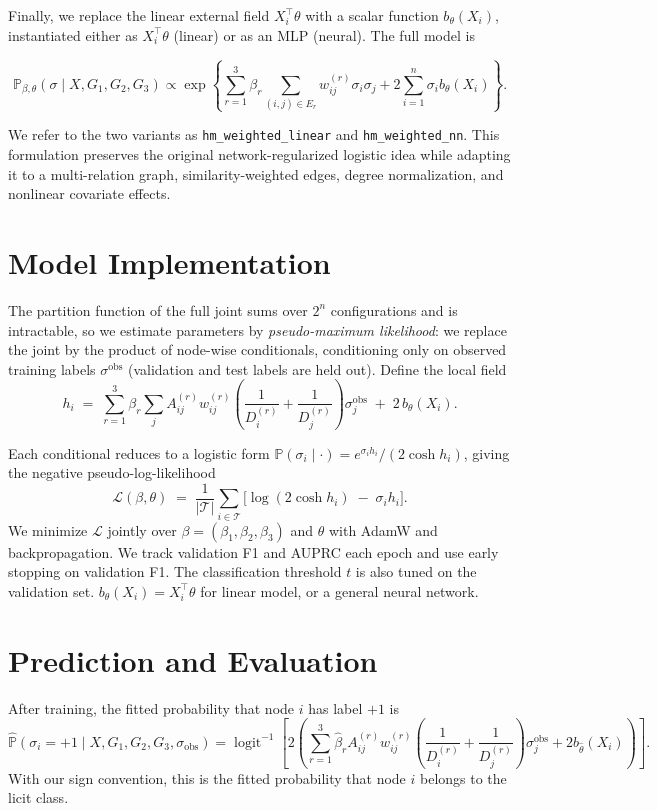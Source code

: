 \documentclass[11pt,reqno]{amsart}
\begin{document}
Finally, we replace the linear external field $X_i^\top\theta$ with a scalar function $b_\theta(X_i)$, instantiated either as $X_i^\top\theta$ (linear) or as an MLP (neural). The full model is


$$
    \mathbb P_{\beta,\theta}(\sigma\mid X,G_1,G_2,G_3)\propto\exp\left\{\sum_{r=1}^3\beta_r\sum_{(i,j)\in E_r}w_{ij}^{(r)}\sigma_i\sigma_j+2\sum_{i=1}^n\sigma_i b_\theta(X_i)\right\}.
$$

We refer to the two variants as \texttt{hm\_weighted\_linear} and \texttt{hm\_weighted\_nn}. This formulation preserves the original network-regularized logistic idea while adapting it to a multi-relation graph, similarity-weighted edges, degree normalization, and nonlinear covariate effects.

\section{Model Implementation}

The partition function of the full joint sums over $2^n$ configurations and is intractable, so we estimate parameters by \emph{pseudo-maximum likelihood}: we replace the joint by the product of node-wise conditionals, conditioning only on observed training labels $\sigma^{\text{obs}}$ (validation and test labels are held out). Define the local field
\[
h_i \;=\; \sum_{r=1}^{3} \beta_r \sum_{j} A_{ij}^{(r)} w_{ij}^{(r)}
\!\left(\frac{1}{D_i^{(r)}} + \frac{1}{D_j^{(r)}}\right)\!
\sigma_j^{\text{obs}}
\;+\; 2\, b_\theta(X_i).
\]

Each conditional reduces to a logistic form $\mathbb{P}(\sigma_i \mid \cdot) = e^{\sigma_i h_i}/(2\cosh h_i)$, giving the negative pseudo-log-likelihood
\[
\mathcal{L}(\beta, \theta) \;=\; \frac{1}{|\mathcal{T}|} \sum_{i \in \mathcal{T}} \bigl[\log(2\cosh h_i) \;-\; \sigma_i h_i\bigr].
\]
We minimize $\mathcal{L}$ jointly over $\beta = (\beta_1, \beta_2, \beta_3)$ and $\theta$ with AdamW and backpropagation. We track validation F1 and AUPRC each epoch and use early stopping on validation F1. The classification threshold $t$ is also tuned on the validation set. $b_\theta(X_i) = X_i^\top \theta$ for linear model, or a general neural network. 

\section{Prediction and Evaluation}

After training, the fitted probability that node $i$ has label $+1$ is
$$
    \widehat{\mathbb P}(\sigma_i=+1\mid X,G_1,G_2,G_3,\sigma_{\mathrm{obs}})
    =
    \operatorname{logit}^{-1}
    \left[
    2\left(
    \sum_{r=1}^3
    \widehat\beta_r
    A_{ij}^{(r)}w_{ij}^{(r)}
    \left(
    \frac{1}{D_i^{(r)}}+\frac{1}{D_j^{(r)}}
    \right)
    \sigma_j^{\mathrm{obs}}
    +
    2b_{\widehat\theta}(X_i)
    \right)
    \right].
$$
With our sign convention, this is the fitted probability that node $i$ belongs to the licit class.
\end{document}

